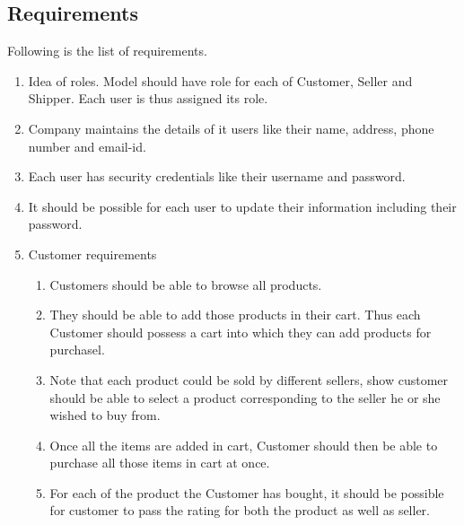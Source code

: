 \documentclass[a4paper,12pt]{article}
\begin{document}
\subsection{Requirements}
Following is the list of requirements.
\begin{enumerate}
  \item Idea of roles. Model should have role for each of Customer, Seller and Shipper. Each user is thus assigned its role.

  \item Company maintains the details of it users like their name, address, phone number and email-id.

  \item Each user has security credentials like their username and password.
  \item It should be possible for each user to update their information including their password.
  \item Customer requirements
  \begin{enumerate}
    \item Customers should be able to browse all products.
    \item They should be able to add those products in their cart. Thus each Customer should possess a cart into which they can add products for purchasel.
    \item Note that each product could be sold by different sellers, show customer should be able to select a product corresponding to the seller he or she wished to buy from. 
    \item Once all the items are added in cart, Customer should then be able to purchase all those items in cart at once.
    \item For each of the product the Customer has bought, it should be possible for customer to pass the rating for both the product as well as seller. 
  \end{enumerate}


\end{enumerate}
\end{document}
